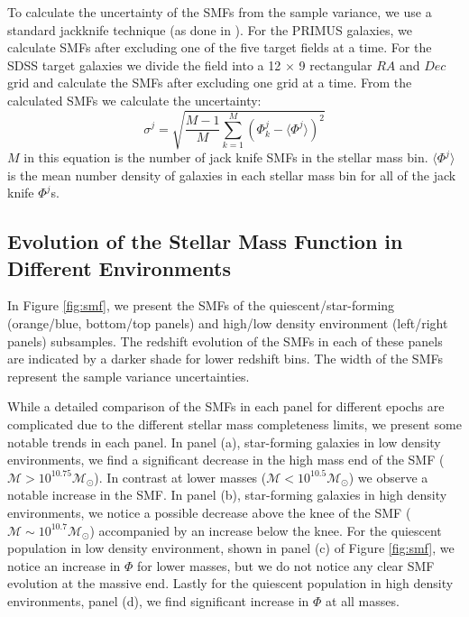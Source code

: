 \documentclass{emulateapj}
\begin{document}
To calculate the uncertainty of the SMFs from the sample variance, we use a standard jackknife technique (as done in \citealt{Moustakas:2013aa}). For the PRIMUS galaxies, we calculate SMFs after excluding one of the five target fields at a time. For the SDSS target galaxies we divide the field into a 12 $\times$ 9 rectangular $RA$ and $Dec$ grid and calculate the SMFs after excluding one grid at a time. From the calculated SMFs we calculate the uncertainty: 
\begin{equation}
\sigma^j = \sqrt{\frac{M-1}{M} \sum\limits_{k=1}^{M} (\Phi^j_k - \langle \Phi^j \rangle)^2}
\end{equation} 
$M$ in this equation is the number of jack knife SMFs in the stellar mass bin. $\langle \Phi^j \rangle$ is the mean number density of galaxies in each stellar mass bin for all of the jack knife $\Phi^j$s. 

\subsection{Evolution of the Stellar Mass Function in Different Environments} \label{sec:smfevol}
In Figure \ref{fig:smf}, we present the SMFs of the quiescent/star-forming (orange/blue, bottom/top panels) and high/low density environment (left/right panels) subsamples. The redshift evolution of the SMFs in each of these panels are indicated by a darker shade for lower redshift bins. The width of the SMFs represent the sample variance uncertainties.

While a detailed comparison of the SMFs in each panel for different epochs are complicated due to the different stellar mass completeness limits, we present some notable trends in each panel. In panel (a), star-forming galaxies in low density environments, we find a significant decrease in the high mass end of the SMF ($\mathcal{M} > 10^{10.75} \mathcal{M}_{\odot}$). In contrast at lower masses ($\mathcal{M} < 10^{10.5} \mathcal{M}_{\odot}$) we observe a notable increase in the SMF. In panel (b), star-forming galaxies in high density environments, we notice a possible decrease above the knee of the SMF ($\mathcal{M} \sim 10^{10.7} \mathcal{M}_{\odot}$) accompanied by an increase below the knee. For the quiescent population in low density environment, shown in panel (c) of Figure \ref{fig:smf}, we notice an increase in $\Phi$ for lower masses, but we do not notice any clear SMF evolution at the massive end. Lastly for the quiescent population in high density environments, panel (d), we find significant increase in $\Phi$ at all masses. 
\end{document}
